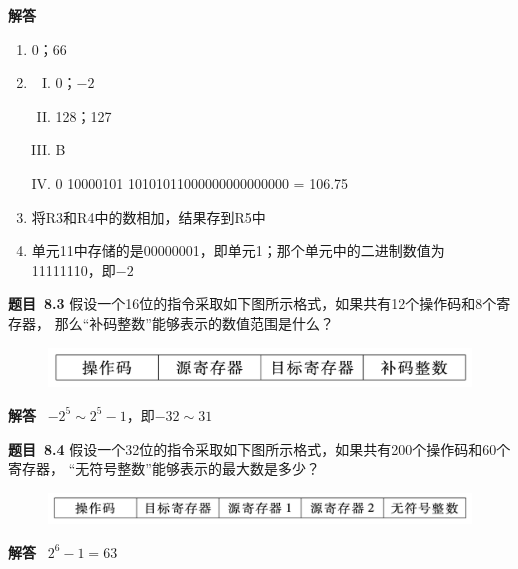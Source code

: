 \documentclass[10pt,a4paper,UTF8]{ctexart}
\newcommand{\problemname}{待定义}
\newenvironment{problem}{\begin{shaded}\par\noindent\textbf{题目\  \problemname}}{\end{shaded}\par}
\newenvironment{solution}{\par\noindent\textbf{解答}\ }{\par}
\begin{document}
\begin{solution}
	\begin{enumerate}[(1)]
		\item 0；66
		\item \begin{enumerate}[I.]
			\item 0；$-2$
			\item 128；127
			\item B
			\item 0 10000101 10101011000000000000000 = 106.75
		\end{enumerate}
		\item 将R3和R4中的数相加，结果存到R5中
		\item 单元11中存储的是00000001，即单元1；那个单元中的二进制数值为11111110，即$-2$
	\end{enumerate}

\end{solution}


\renewcommand{\problemname}{8.3}
\begin{problem}
	假设一个16位的指令采取如下图所示格式，如果共有12个操作码和8个寄存器，
	那么“补码整数”能够表示的数值范围是什么？
\end{problem}

\begin{figure}[H]
	\centering
	\includegraphics[scale=0.3]{img/8.3.png}
\end{figure}

\begin{solution}
	$-2^5\sim 2^5-1$，即$-32\sim 31$
\end{solution}


\renewcommand{\problemname}{8.4}
\begin{problem}
	假设一个32位的指令采取如下图所示格式，如果共有200个操作码和60个寄存器，
	“无符号整数”能够表示的最大数是多少？
\end{problem}

\begin{figure}[H]
	\centering
	\includegraphics[scale=0.35]{img/8.4.png}
\end{figure}

\begin{solution}
	$2^6-1=63$
\end{solution}
\end{document}

